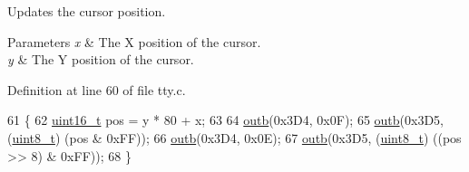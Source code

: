 Updates the cursor position. 


\begin{DoxyParams}{Parameters}
{\em x} & The X position of the cursor. \\
\hline
{\em y} & The Y position of the cursor. \\
\hline
\end{DoxyParams}


Definition at line 60 of file tty.\+c.


\begin{DoxyCode}
61 \{
62     \hyperlink{a00140_a273cf69d639a59973b6019625df33e30_a273cf69d639a59973b6019625df33e30}{uint16\_t} pos = y * 80 + x;
63  
64     \hyperlink{a00164_aa37f5841c54156a4b14fc0d6f626b44f_aa37f5841c54156a4b14fc0d6f626b44f}{outb}(0x3D4, 0x0F);
65     \hyperlink{a00164_aa37f5841c54156a4b14fc0d6f626b44f_aa37f5841c54156a4b14fc0d6f626b44f}{outb}(0x3D5, (\hyperlink{a00140_aba7bc1797add20fe3efdf37ced1182c5_aba7bc1797add20fe3efdf37ced1182c5}{uint8\_t}) (pos & 0xFF));
66     \hyperlink{a00164_aa37f5841c54156a4b14fc0d6f626b44f_aa37f5841c54156a4b14fc0d6f626b44f}{outb}(0x3D4, 0x0E);
67     \hyperlink{a00164_aa37f5841c54156a4b14fc0d6f626b44f_aa37f5841c54156a4b14fc0d6f626b44f}{outb}(0x3D5, (\hyperlink{a00140_aba7bc1797add20fe3efdf37ced1182c5_aba7bc1797add20fe3efdf37ced1182c5}{uint8\_t}) ((pos >> 8) & 0xFF));
68 \}
\end{DoxyCode}

